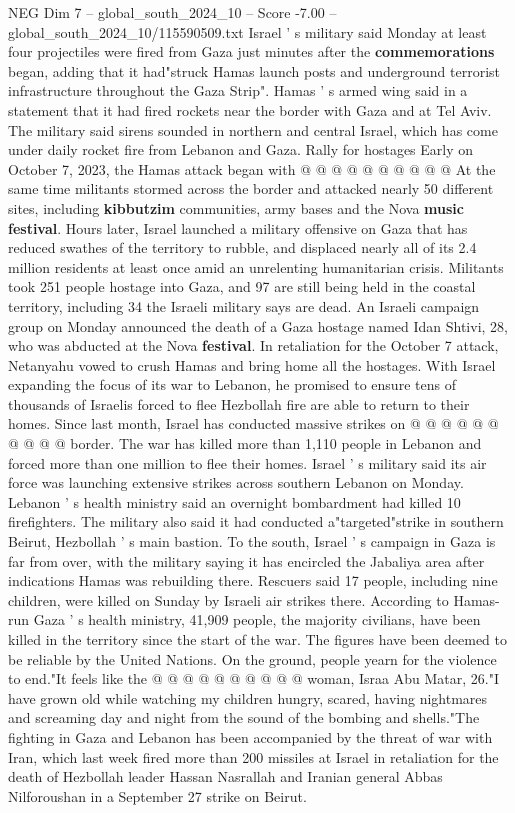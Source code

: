 \begin{textsample}{NEG Dim 7 – global\_south\_2024\_10 – Score -7.00 – global\_south\_2024\_10/115590509.txt}
Israel ' s military said Monday at least four projectiles were fired from Gaza just minutes after the \textbf{commemorations} began, adding that it had"struck Hamas launch posts and underground terrorist infrastructure throughout the Gaza Strip".
Hamas ' s armed wing said in a statement that it had fired rockets near the border with Gaza and at Tel Aviv.
The military said sirens sounded in northern and central Israel, which has come under daily rocket fire from Lebanon and Gaza.
Rally for hostages Early on October 7, 2023, the Hamas attack began with @ @ @ @ @ @ @ @ @ @ At the same time militants stormed across the border and attacked nearly 50 different sites, including \textbf{kibbutzim} communities, army bases and the Nova \textbf{music} \textbf{festival}.
Hours later, Israel launched a military offensive on Gaza that has reduced swathes of the territory to rubble, and displaced nearly all of its 2.4 million residents at least once amid an unrelenting humanitarian crisis.
Militants took 251 people hostage into Gaza, and 97 are still being held in the coastal territory, including 34 the Israeli military says are dead.
An Israeli campaign group on Monday announced the death of a Gaza hostage named Idan Shtivi, 28, who was abducted at the Nova \textbf{festival}.
In retaliation for the October 7 attack, Netanyahu vowed to crush Hamas and bring home all the hostages.
With Israel expanding the focus of its war to Lebanon, he promised to ensure tens of thousands of Israelis forced to flee Hezbollah fire are able to return to their homes.
Since last month, Israel has conducted massive strikes on @ @ @ @ @ @ @ @ @ @ border.
The war has killed more than 1,110 people in Lebanon and forced more than one million to flee their homes.
Israel ' s military said its air force was launching extensive strikes across southern Lebanon on Monday.
Lebanon ' s health ministry said an overnight bombardment had killed 10 firefighters.
The military also said it had conducted a"targeted"strike in southern Beirut, Hezbollah ' s main bastion.
To the south, Israel ' s campaign in Gaza is far from over, with the military saying it has encircled the Jabaliya area after indications Hamas was rebuilding there.
Rescuers said 17 people, including nine children, were killed on Sunday by Israeli air strikes there.
According to Hamas-run Gaza ' s health ministry, 41,909 people, the majority civilians, have been killed in the territory since the start of the war.
The figures have been deemed to be reliable by the United Nations.
On the ground, people yearn for the violence to end."It feels like the @ @ @ @ @ @ @ @ @ @ woman, Israa Abu Matar, 26."I have grown old while watching my children hungry, scared, having nightmares and screaming day and night from the sound of the bombing and shells."The fighting in Gaza and Lebanon has been accompanied by the threat of war with Iran, which last week fired more than 200 missiles at Israel in retaliation for the death of Hezbollah leader Hassan Nasrallah and Iranian general Abbas Nilforoushan in a September 27 strike on Beirut.

\end{textsample}

